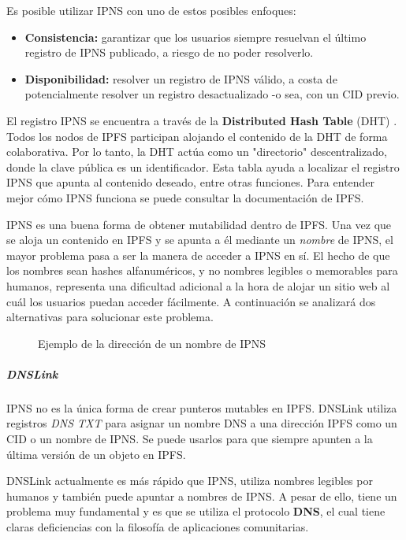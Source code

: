 Es posible utilizar IPNS con uno de estos posibles enfoques:
\begin{itemize}
    \item \textbf{Consistencia:} garantizar que los usuarios siempre resuelvan el último registro de IPNS publicado, a riesgo de no poder resolverlo.
    \item \textbf{Disponibilidad:} resolver un registro de IPNS válido, a costa de potencialmente resolver un registro desactualizado -o sea, con un CID previo.
\end{itemize}

El registro IPNS se encuentra a través de la \textbf{Distributed Hash Table} (DHT) \cite{dht}. Todos los nodos de IPFS participan alojando el contenido de la DHT de forma colaborativa. Por lo tanto, la DHT actúa como un "directorio" descentralizado, donde la clave pública es un identificador. Esta tabla ayuda a localizar el registro IPNS que apunta al contenido deseado, entre otras funciones. Para entender mejor cómo IPNS funciona se puede consultar la documentación de IPFS.

IPNS es una buena forma de obtener mutabilidad dentro de IPFS. Una vez que se aloja un contenido en IPFS y se apunta a él mediante un \textit{nombre} de IPNS, el mayor problema pasa a ser la manera de acceder a IPNS en sí. El hecho de que los nombres sean hashes alfanuméricos, y no nombres legibles o memorables para humanos, representa una dificultad adicional a la hora de alojar un sitio web al cuál los usuarios puedan acceder fácilmente. A continuación se analizará dos alternativas para solucionar este problema.

\begin{figure}[h]
\centering
{}
\caption{Ejemplo de la dirección de un nombre de IPNS}
\end{figure}

\subparagraph{DNSLink}

IPNS no es la única forma de crear punteros mutables en IPFS. DNSLink \cite{dnslink} utiliza registros \textit{DNS TXT} para asignar un nombre DNS a una dirección IPFS como un CID o un nombre de IPNS. Se puede usarlos para que siempre apunten a la última versión de un objeto en IPFS.

DNSLink actualmente es más rápido que IPNS, utiliza nombres legibles por humanos y también puede apuntar a nombres de IPNS. A pesar de ello, tiene un problema muy fundamental y es que se utiliza el protocolo \textbf{DNS}, el cual tiene claras deficiencias con la filosofía de aplicaciones comunitarias.

